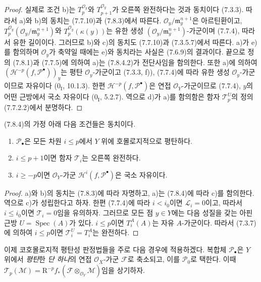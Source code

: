 \begin{proof}
실제로 조건 b)는 $T_p^{\mathscr O_y}$와 $T_{p+1}^{\mathscr O_y}$가
오른쪽 완전하다는 것과 동치이다 (7.3.3). 따라서 a)와 b)의 동치는
(7.7.10)과 (7.8.3)에서 따른다.
$\mathscr O_y/\mathfrak m_y^{n+1}$은 아르틴환이고,
$T_p^{\mathscr O_y}(\mathscr O_y/\mathfrak m_y^{n+1})$와
$T_p^{\mathscr O_y}(\kappa(y))$는 유한 생성
$(\mathscr O_y/\mathfrak m_y^{n+1})$-가군이며 (7.7.4), 따라서 유한
길이이다. 그러므로 b)와 c)의 동치도 (7.7.10)과 (7.3.5.7)에서 따른다.
a)가 e)를 함의하며 $\mathscr O_y$가 축약일 때에는 e)와 동치라는 사실은
(7.6.9)의 결과이다. 끝으로 정의 (7.8.1)과 (7.7.5)에 의하여 a)는
(7.8.4.2)가 전단사임을 함의한다. 또한 a)에 의하여
$(\mathscr H^{-p}(f,\mathscr P^\bullet))_y$는 평탄
$\mathscr O_y$-가군이고 (7.3.3, f)), (7.7.4)에 따라 유한 생성
$\mathscr O_y$-가군이므로
자유이다 ($0_{\mathrm I}$, 10.1.3). 한편
$\mathscr H^{-p}(f,\mathscr P^\bullet)$은 연접 $\mathscr O_Y$-가군이므로
(7.7.4), $y$의 어떤 근방에서 국소 자유이다
($0_{\mathrm I}$, 5.2.7). 역으로 d)가 a)를 함의함은 함자
$\mathscr T_p^U$의 정의 (7.7.2.2)에서 분명하다.
\end{proof}

\begin{proposition}[7.8.5]
(7.8.4)의 가정 아래 다음 조건들은 동치이다.
\begin{enumerate}
  \item[a)] $\mathscr P_\bullet$은 모든 차원 $i\leq p$에서 $Y$ 위에
    호몰로지적으로 평탄하다.
  \item[b)] $i\leq p+1$이면 함자 $\mathscr T_i$는 오른쪽 완전하다.
  \item[c)] $i\geq-p$이면 $\mathscr O_Y$-가군
    $\mathscr H^i(f,\mathscr P^\bullet)$은 국소 자유이다.
\end{enumerate}
\end{proposition}

\begin{proof}
a)와 b)의 동치는 (7.8.3)에 따라 자명하고, a)는 (7.8.4)에 따라 c)를
함의한다. 역으로 c)가 성립한다고 하자. 한편 (7.7.4)에 따라 $i<i_0$이면
$\mathscr L_i=0$이고, 따라서 $i\leq i_0$이면 $\mathscr T_i=0$임을
유의하자. 그러므로 모든 점 $y\in Y$에는 다음 성질을 갖는 아핀 근방
$U=\operatorname{Spec}(A)$가 있다. $i\leq p$이면 $T_i^A(A)$는 자유
$A$-가군이다. 따라서 (7.3.7)에 의하여 $i\leq p$이면
$\mathscr T_i^U=T_i^A$는 완전하다.
\end{proof}

이제 코호몰로지적 평탄성 판정법들을 주로 다음 경우에 적용하겠다.
복합체 $\mathscr P_\bullet$은 $Y$ 위에서 \emph{평탄}한 \emph{단 하나}의
연접 $\mathscr O_X$-가군 $\mathscr F$로 축소되고,
이를 $\mathscr P_0$로 택한다. 이때
$\mathscr T_p(\mathscr M)=\mathrm R^{-p}f_*
(\mathscr F\otimes_{\mathscr O_Y}\mathscr M)$임을 상기하자.

